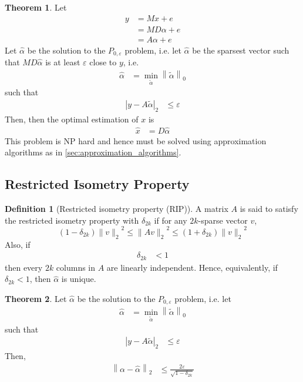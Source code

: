 \documentclass[titlepage, fleqn, a4paper, 12pt, twoside]{article}
\theoremstyle{definition}
\newtheorem{definition}{Definition}
\theoremstyle{theorem}
\newtheorem{theorem}{Theorem}
\renewcommand{\tilde}{\widetilde}
\begin{document}
\begin{theorem}
	Let
	\begin{align*}
		y &= M x + e\\
		&= M D \alpha + e\\
		&= A \alpha + e
	\end{align*}
	Let $\hat{\alpha}$ be the solution to the $P_{0,\varepsilon}$ problem, i.e. let $\hat{\alpha}$ be the sparsest vector such that $M D \hat{\alpha}$ is at least $\varepsilon$ close to $y$, i.e.
	\begin{align*}
		\hat{\alpha} &= \min\limits_{\tilde{\alpha}} \left\| \tilde{\alpha} \right\|_0
	\end{align*}
	such that
	\begin{align*}
		\left| y - A \tilde{\alpha} \right|_2 &\le \varepsilon
	\end{align*}
	Then, then the optimal estimation of $x$ is
	\begin{align*}
		\hat{x} &= D \hat{\alpha}
	\end{align*}
	This problem is NP hard and hence must be solved using approximation algorithms as in \cref{sec:approximation_algorithms}.
\end{theorem}

\subsection{Restricted Isometry Property}

\begin{definition}[Restricted isometry property (RIP)]
	A matrix $A$ is said to satisfy the restricted isometry property with $\delta_{2 k}$ if for any $2 k$-sparse vector $v$,
	\begin{equation*}
		(1 - \delta_{2 k}) {\|v\|_2}^2 \le {\|A v\|_2}^2 \le (1 + \delta_{2 k}) {\|v\|_2}^2
	\end{equation*}
	Also, if
	\begin{align*}
		\delta_{2 k} &< 1
	\end{align*}
	then every $2 k$ columns in $A$ are linearly independent.
	Hence, equivalently, if $\delta_{2 k} < 1$, then $\hat{\alpha}$ is unique.
\end{definition}

\begin{theorem}
	Let $\hat{\alpha}$ be the solution to the $P_{0,\varepsilon}$ problem, i.e. let
	\begin{align*}
		\hat{\alpha} &= \min\limits_{\tilde{\alpha}} \left\| \tilde{\alpha} \right\|_0
	\end{align*}
	such that
	\begin{align*}
		\left| y - A \tilde{\alpha} \right|_2 &\le \varepsilon
	\end{align*}
	Then,
	\begin{align*}
		\left\| \alpha - \hat{\alpha} \right\|_2 &\le \frac{2 \varepsilon}{\sqrt{1 - \delta_{2 k}}}
	\end{align*}
\end{theorem}
\end{document}

